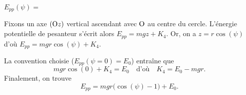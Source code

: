 


\begin{enonce}
$E_{pp}(\psi) =$
\end{enonce}


\begin{corrige}
Fixons un axe $(\ptO z)$ vertical ascendant avec $\ptO$ au centre du cercle. L'énergie potentielle de pesanteur s'écrit alors $E_{pp}=mgz+K_4$. Or, on a $z=r\cos(\psi)$ d'où $E_{pp}=mgr\cos(\psi)+K_4$. 

La convention choisie ($E_{pp}(\psi=0)=E_0$) entraîne que 
\[
mgr\cos(0)+K_4=E_0
\quad\text{d'où}\quad
K_4=E_0-mgr.
\]
Finalement, on trouve
\[
E_{pp}=mgr\big(\cos(\psi)-1\big)+E_0.
\]
\end{corrige}


\finEntrainement






\hauteurLargeurCadreReponse		{8mm}{3cm}
\initialisationEntrainement


\debutEntrainement


